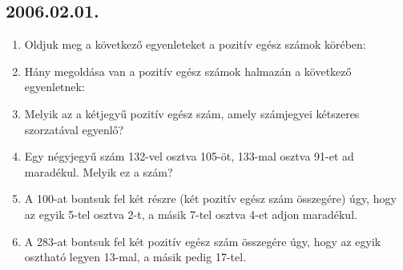 \subsection*{2006.02.01.}
\begin{enumerate}
\item Oldjuk meg a következő egyenleteket a pozitív egész számok körében:


\item Hány megoldása van a pozitív egész számok halmazán a következő egyenletnek:


\item Melyik az a kétjegyű pozitív egész szám, amely számjegyei kétszeres szorzatával egyenlő?

\item Egy négyjegyű szám 132-vel osztva 105-öt, 133-mal osztva 91-et ad maradékul. Melyik ez a szám?

\item A 100-at bontsuk fel két részre (két pozitív egész szám összegére) úgy, hogy az egyik 5-tel osztva 2-t, a másik 7-tel osztva 4-et adjon maradékul.

\item A 283-at bontsuk fel két pozitív egész szám összegére úgy, hogy az egyik osztható legyen 13-mal, a másik pedig 17-tel.


\end{enumerate}

